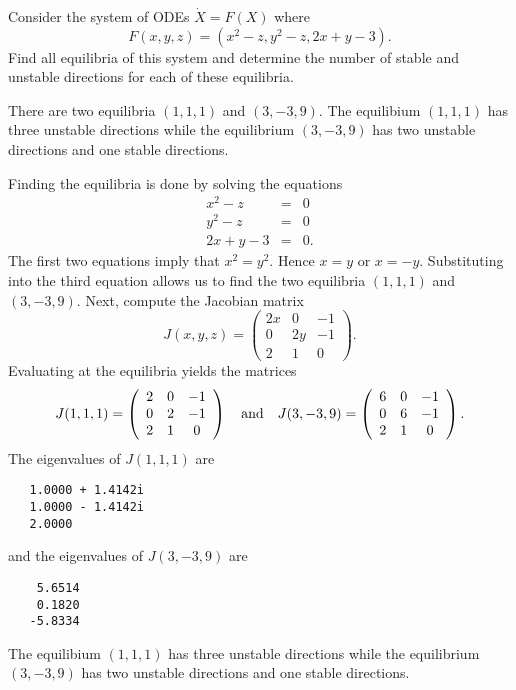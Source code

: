 \documentclass{ximera}
\begin{document}
\begin{exercise} \label{c14.2.1E}
Consider the system of ODEs $\dot{X}=F(X)$ where
\[
F(x,y,z) = (x^2 - z, y^2 - z, 2x + y - 3).
\]
Find all equilibria of this system and determine the number of stable and 
unstable directions for each of these equilibria.

\begin{solution}
\ans There are two equilibria $(1,1,1)$ and $(3,-3,9)$.
The equilibium $(1,1,1)$ has three unstable directions while the
equilibrium $(3,-3,9)$ has two unstable directions and one stable directions.

\soln  Finding the equilibria is done by solving the equations
\begin{eqnarray*}
x^2-z & = & 0 \\
y^2-z & = & 0 \\
2x+y-3 & = & 0.
\end{eqnarray*}
The first two equations imply that $x^2=y^2$.  Hence $x=y$ or $x=-y$. 
Substituting into the third equation allows us to find the two equilibria
$(1,1,1)$ and $(3,-3,9)$.  Next, compute the Jacobian matrix
\[
J(x,y,z) = \left(\begin{array}{ccc}
2x & 0 & -1\\ 0 & 2y & -1\\ 2 & 1 & 0 \end{array}\right).
\]
Evaluating at the equilibria yields the matrices
\[
J(1,1,1) = \left(\begin{array}{ccc}
2 & 0 & -1\\ 0 & 2 & -1\\ 2 & 1 & 0 \end{array}\right)
\quad\mbox{and}\quad 
J(3,-3,9) = \left(\begin{array}{ccc}
6 & 0 & -1\\ 0 & 6 & -1\\ 2 & 1 & 0 \end{array}\right).
\]
The eigenvalues of $J(1,1,1)$ are
\begin{verbatim}
   1.0000 + 1.4142i
   1.0000 - 1.4142i
   2.0000     
\end{verbatim}
and the eigenvalues of $J(3,-3,9)$ are
\begin{verbatim}
    5.6514
    0.1820
   -5.8334
\end{verbatim}
The equilibium $(1,1,1)$ has three unstable directions while the
equilibrium $(3,-3,9)$ has two unstable directions and one stable 
directions.




\end{solution}
\end{exercise}
\end{document}
